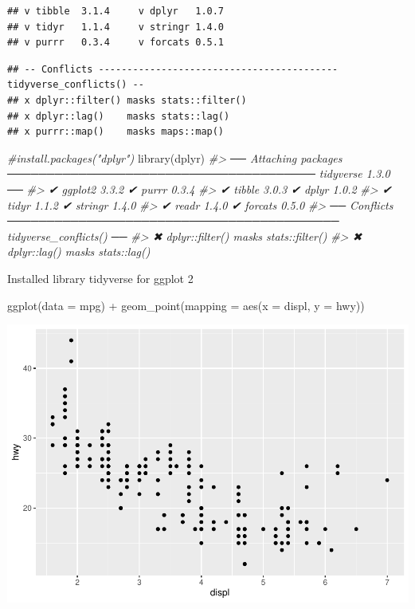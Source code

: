 \documentclass[
]{article}
\newenvironment{Shaded}{\begin{snugshade}}{\end{snugshade}}
\newcommand{\AttributeTok}[1]{\textcolor[rgb]{0.77,0.63,0.00}{#1}}
\newcommand{\CommentTok}[1]{\textcolor[rgb]{0.56,0.35,0.01}{\textit{#1}}}
\newcommand{\FunctionTok}[1]{\textcolor[rgb]{0.00,0.00,0.00}{#1}}
\newcommand{\NormalTok}[1]{#1}
\newcommand{\SpecialCharTok}[1]{\textcolor[rgb]{0.00,0.00,0.00}{#1}}
\begin{document}
\begin{verbatim}
## v tibble  3.1.4     v dplyr   1.0.7
## v tidyr   1.1.4     v stringr 1.4.0
## v purrr   0.3.4     v forcats 0.5.1
\end{verbatim}

\begin{verbatim}
## -- Conflicts ------------------------------------------ tidyverse_conflicts() --
## x dplyr::filter() masks stats::filter()
## x dplyr::lag()    masks stats::lag()
## x purrr::map()    masks maps::map()
\end{verbatim}

\begin{Shaded}
\begin{Highlighting}[]
\CommentTok{\#install.packages("dplyr")}
\FunctionTok{library}\NormalTok{(dplyr) }
\CommentTok{\#\textgreater{} ── Attaching packages ─────────────────────────────────────── tidyverse 1.3.0 ──}
\CommentTok{\#\textgreater{} ✔ ggplot2 3.3.2     ✔ purrr   0.3.4}
\CommentTok{\#\textgreater{} ✔ tibble  3.0.3     ✔ dplyr   1.0.2}
\CommentTok{\#\textgreater{} ✔ tidyr   1.1.2     ✔ stringr 1.4.0}
\CommentTok{\#\textgreater{} ✔ readr   1.4.0     ✔ forcats 0.5.0}
\CommentTok{\#\textgreater{} ── Conflicts ────────────────────────────────────────── tidyverse\_conflicts() ──}
\CommentTok{\#\textgreater{} ✖ dplyr::filter() masks stats::filter()}
\CommentTok{\#\textgreater{} ✖ dplyr::lag()    masks stats::lag()}
\end{Highlighting}
\end{Shaded}

Installed library tidyverse for ggplot 2

\begin{Shaded}
\begin{Highlighting}[]
\FunctionTok{ggplot}\NormalTok{(}\AttributeTok{data =}\NormalTok{ mpg) }\SpecialCharTok{+} 
  \FunctionTok{geom\_point}\NormalTok{(}\AttributeTok{mapping =} \FunctionTok{aes}\NormalTok{(}\AttributeTok{x =}\NormalTok{ displ, }\AttributeTok{y =}\NormalTok{ hwy))}
\end{Highlighting}
\end{Shaded}

\includegraphics{Assignments_files/figure-latex/unnamed-chunk-38-1.pdf}
\end{document}
